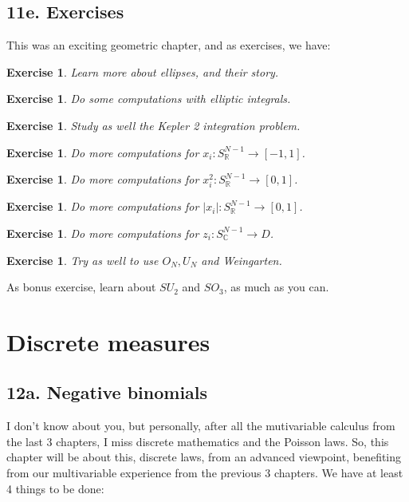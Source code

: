 \documentclass[12pt]{amsbook}
\newtheorem{exercise}[theorem]{Exercise}
\begin{document}
\section*{11e. Exercises}

This was an exciting geometric chapter, and as exercises, we have:

\begin{exercise}
Learn more about ellipses, and their story.
\end{exercise}

\begin{exercise}
Do some computations with elliptic integrals. 
\end{exercise}

\begin{exercise}
Study as well the Kepler 2 integration problem.
\end{exercise}

\begin{exercise}
Do more computations for $x_i:S^{N-1}_{\mathbb R}\to[-1,1]$.
\end{exercise}

\begin{exercise}
Do more computations for $x_i^2:S^{N-1}_{\mathbb R}\to[0,1]$.
\end{exercise}

\begin{exercise}
Do more computations for $|x_i|:S^{N-1}_{\mathbb R}\to[0,1]$.
\end{exercise}

\begin{exercise}
Do more computations for $z_i:S^{N-1}_{\mathbb C}\to D$.
\end{exercise}

\begin{exercise}
Try as well to use $O_N,U_N$ and Weingarten.
\end{exercise}

As bonus exercise, learn about $SU_2$ and $SO_3$, as much as you can.

\chapter{Discrete measures}

\section*{12a. Negative binomials}

I don't know about you, but personally, after all the mutivariable calculus from the last 3 chapters, I miss discrete mathematics and the Poisson laws. So, this chapter will be about this, discrete laws, from an advanced viewpoint, benefiting from our multivariable experience from the previous 3 chapters. We have at least 4 things to be done:
\end{document}
